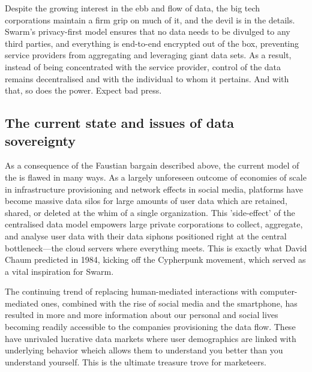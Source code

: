 Despite the growing interest in the ebb and flow of data, the big tech corporations maintain a firm grip on much of it, and the devil is in the details. Swarm's privacy-first model ensures that no data needs to be divulged to any third parties, and everything is end-to-end encrypted out of the box, preventing service providers from aggregating and leveraging giant data sets. As a result, instead of being concentrated with the service provider, control of the data remains decentralised and with the individual to whom it pertains. And with that, so does the power. Expect bad press.

\subsection{The current state and issues of data sovereignty \statusgreen }\label{sec:data-sovereignty}

As a consequence of the Faustian bargain described above, the current model of the  is flawed in many ways. As a largely unforeseen outcome of economies of scale in infrastructure provisioning and network effects in social media, platforms have become massive data silos for large amounts of user data which are retained, shared, or deleted at the whim of a single organization. This 'side-effect' of the centralised data model empowers large private corporations to collect, aggregate, and analyse user data with their data siphons positioned right at the central bottleneck—the cloud servers where everything meets. This is exactly what David Chaum predicted in 1984, kicking off the Cypherpunk movement, which served as a vital inspiration for Swarm.

The continuing trend of replacing human-mediated interactions with computer-mediated ones, combined with the rise of social media and the smartphone, has resulted in more and more information about our personal and social lives becoming readily accessible to the companies provisioning the data flow. These have unrivaled lucrative data markets where user demographics are linked with underlying behavior wheich allows them to understand you better than you understand yourself. This is the ultimate treasure trove for marketeers.

